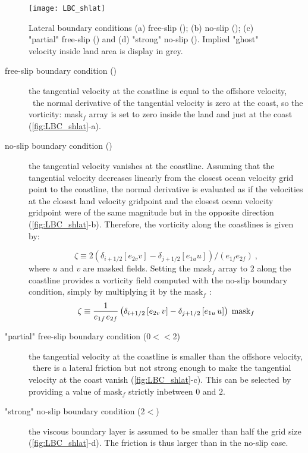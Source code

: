 \documentclass[../main/NEMO_manual]{subfiles}
\begin{document}
\begin{figure}[h]
  \centering
  \texttt{[image: LBC\_shlat]}
  \caption[Lateral boundary conditions]{
    Lateral boundary conditions
    (a) free-slip                       (\protect{});
    (b) no-slip                         (\protect{});
    (c) "partial" free-slip (\protect{}) and
    (d) "strong" no-slip    (\protect{}).
    Implied "ghost" velocity inside land area is display in grey.}
  \label{fig:LBC_shlat}
\end{figure}

\begin{description}

\item [free-slip boundary condition ({})] the tangential velocity at
  the coastline is equal to the offshore velocity,
  \ie\ the normal derivative of the tangential velocity is zero at the coast,
  so the vorticity: mask$_{f}$ array is set to zero inside the land and just at the coast
  (\autoref{fig:LBC_shlat}-a).

\item [no-slip boundary condition ({})] the tangential velocity vanishes at the coastline.
  Assuming that the tangential velocity decreases linearly from
  the closest ocean velocity grid point to the coastline,
  the normal derivative is evaluated as if the velocities at the closest land velocity gridpoint and
  the closest ocean velocity gridpoint were of the same magnitude but in the opposite direction
  (\autoref{fig:LBC_shlat}-b).
  Therefore, the vorticity along the coastlines is given by:

  \[
    \zeta \equiv 2 \left(\delta_{i+1/2} \left[e_{2v} v \right] - \delta_{j+1/2} \left[e_{1u} u \right] \right) / \left(e_{1f} e_{2f} \right) \ ,
  \]
  where $u$ and $v$ are masked fields.
  Setting the mask$_{f}$ array to $2$ along the coastline provides a vorticity field computed with
  the no-slip boundary condition, simply by multiplying it by the mask$_{f}$ :
  \[
    \zeta \equiv \frac{1}{e_{1f} {\kern 1pt}e_{2f} }\left( {\delta_{i+1/2}
        \left[ {e_{2v} \,v} \right]-\delta_{j+1/2} \left[ {e_{1u} \,u} \right]}
    \right)\;\mbox{mask}_f
  \]

\item ["partial" free-slip boundary condition (0$<$$<$2)] the tangential velocity at
  the coastline is smaller than the offshore velocity, \ie\ there is a lateral friction but
  not strong enough to make the tangential velocity at the coast vanish (\autoref{fig:LBC_shlat}-c).
  This can be selected by providing a value of mask$_{f}$ strictly inbetween $0$ and $2$.

\item ["strong" no-slip boundary condition (2$<$)] the viscous boundary layer is assumed to
  be smaller than half the grid size (\autoref{fig:LBC_shlat}-d).
  The friction is thus larger than in the no-slip case.

\end{description}
\end{document}
